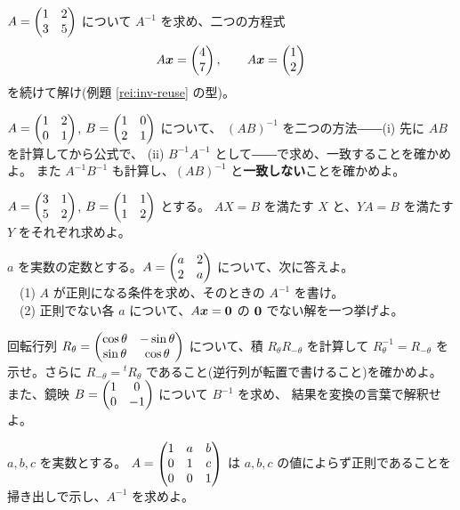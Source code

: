 \begin{mondai}[基本]\label{q:inv-ex3}
$A = \begin{pmatrix}1 & 2 \\ 3 & 5\end{pmatrix}$ について $A^{-1}$ を求め、二つの方程式
\[
A\bm{x} = \begin{pmatrix}4 \\ 7\end{pmatrix}, \qquad A\bm{x} = \begin{pmatrix}1 \\ 2\end{pmatrix}
\]
を続けて解け(例題 \ref{rei:inv-reuse} の型)。
\end{mondai}

\begin{mondai}[基本]\label{q:inv-ex4}
$A = \begin{pmatrix}1 & 2 \\ 0 & 1\end{pmatrix}$, $B = \begin{pmatrix}1 & 0 \\ 2 & 1\end{pmatrix}$ について、
$(AB)^{-1}$ を二つの方法――(i) 先に $AB$ を計算してから公式で、
(ii) $B^{-1}A^{-1}$ として――で求め、一致することを確かめよ。
また $A^{-1}B^{-1}$ も計算し、$(AB)^{-1}$ と\textbf{一致しない}ことを確かめよ。
\end{mondai}

\begin{mondai}[標準]\label{q:inv-ex5}
$A = \begin{pmatrix}3 & 1 \\ 5 & 2\end{pmatrix}$, $B = \begin{pmatrix}1 & 1 \\ 1 & 2\end{pmatrix}$ とする。
$AX = B$ を満たす $X$ と、$YA = B$ を満たす $Y$ をそれぞれ求めよ。
\end{mondai}

\begin{mondai}[標準]\label{q:inv-ex6}
$a$ を実数の定数とする。$A = \begin{pmatrix}a & 2 \\ 2 & a\end{pmatrix}$ について、次に答えよ。\\
　(1) $A$ が正則になる条件を求め、そのときの $A^{-1}$ を書け。\\
　(2) 正則でない各 $a$ について、$A\bm{x} = \bm{0}$ の
$\bm{0}$ でない解を一つ挙げよ。
\end{mondai}

\begin{mondai}[標準]\label{q:inv-ex7}
回転行列 $R_\theta = \begin{pmatrix}\cos\theta & -\sin\theta \\
\sin\theta & \cos\theta\end{pmatrix}$ について、積 $R_\theta R_{-\theta}$ を計算して
$R_\theta^{-1} = R_{-\theta}$ を示せ。さらに $R_{-\theta} = {}^t R_\theta$
であること(逆行列が転置で書けること)を確かめよ。
また、鏡映 $B = \begin{pmatrix}1 & 0 \\ 0 & -1\end{pmatrix}$ について $B^{-1}$ を求め、
結果を変換の言葉で解釈せよ。
\end{mondai}

\begin{mondai}[標準]\label{q:inv-ex8}
$a, b, c$ を実数とする。
$A = \begin{pmatrix}1 & a & b \\ 0 & 1 & c \\ 0 & 0 & 1\end{pmatrix}$ は
$a, b, c$ の値によらず正則であることを掃き出しで示し、$A^{-1}$ を求めよ。
\end{mondai}

